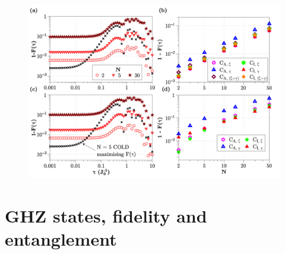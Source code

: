 \begin{figure}[h]
    \centering
    \includegraphics[width=\linewidth]{images/ising_max_int_plots.png} \caption[Plot of final state fidelity for the Ising spin chain for different cost functions with LCD applied.]{}\label{fig:ising_lcd_max_int}
\end{figure}

\section{GHZ states, fidelity and entanglement}

